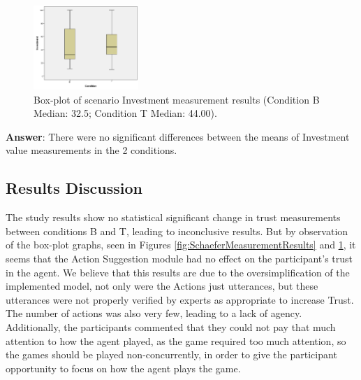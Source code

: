 \begin{figure}[hbt]
    \centering
    \includegraphics[width=150px]{graphs/InvestmentBoxPlot.png}
    \caption{Box-plot of scenario Investment measurement results (Condition B Median: 32.5; Condition T Median: 44.00).}
    \label{fig:InvestmentBoxPlot}
\end{figure}

\textbf{Answer}: There were no significant differences between the means of Investment value measurements in the 2 conditions.

\subsection{Results Discussion}
The study results show no statistical significant change in trust measurements between conditions B and T, leading to inconclusive results. But by observation of the box-plot graphs, seen in Figures \ref{fig:SchaeferMeasurementResults} and \ref{fig:InvestmentBoxPlot}, it seems that the Action Suggestion module had no effect on the participant's trust in the agent.
We believe that this results are due to the oversimplification of the implemented model, not only were the Actions just utterances, but these utterances were not properly verified by experts as appropriate to increase Trust. The number of actions was also very few, leading to a lack of agency. Additionally, the participants commented that they could not pay that much attention to how the agent played, as the game required too much attention, so the games should be played non-concurrently, in order to give the participant opportunity to focus on how the agent plays the game.